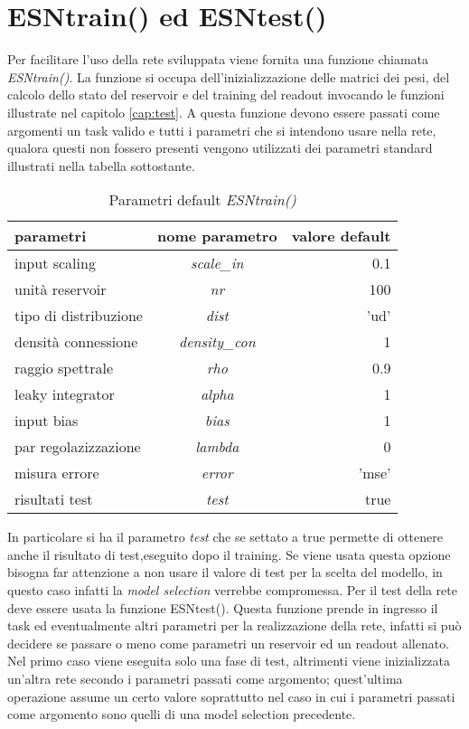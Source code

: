 \section{ESNtrain() ed ESNtest()}
Per facilitare l'uso della rete sviluppata viene fornita una funzione chiamata \textit{ESNtrain()}. La funzione si occupa dell'inizializzazione delle matrici dei pesi, del calcolo dello stato del reservoir e del training del readout invocando le funzioni illustrate nel capitolo \ref{cap:test}. A questa funzione devono essere passati come argomenti un task valido e tutti i parametri che si intendono usare nella rete, qualora questi non fossero presenti vengono utilizzati dei parametri standard illustrati nella tabella sottostante.
\begin{table}[h]
	\begin{center}
	 \begin{tabular}{|l|c|r|}
	 	\hline
	 	\textbf{parametri}		&\textbf{nome parametro}&   \textbf{valore default}\\
	 	\hline
	 	input scaling			&  \textit{scale\_in}	&   0.1\\
	 	\hline
	 	unità reservoir 		&  \textit{nr}          &   100\\
	 	\hline
	 	tipo di distribuzione	&  \textit{dist}        &   'ud'\\
	 	\hline
	 	densità connessione		&  \textit{density\_con}&   1\\
	 	\hline
	 	raggio spettrale		&  \textit{rho}			&   0.9\\
	 	\hline
	 	leaky integrator		&  \textit{alpha}		&   1\\
	 	\hline
	 	input bias				&  \textit{bias}		&   1\\
	 	\hline
	 	par regolazizzazione	&  \textit{lambda}		&   0\\
	 	\hline
	 	misura errore			&  \textit{error}		&   'mse'\\
	 	\hline
	 	risultati test			&  \textit{test}		&   true\\
	 	\hline
	 \end{tabular}
	\end{center}
	\caption{Parametri default \textit{ESNtrain()}}
\end{table}

In particolare si ha il parametro \textit{test} che se settato a true permette di ottenere anche il risultato di test,eseguito dopo il training. Se viene usata questa opzione bisogna far attenzione a non usare il valore di test per la scelta del modello, in questo caso infatti la \textit{model selection} verrebbe compromessa. Per il test della rete deve essere usata la funzione ESNtest(). Questa funzione prende in ingresso il task ed eventualmente altri parametri per la realizzazione della rete, infatti si può decidere se passare o meno come parametri un reservoir ed un readout allenato. Nel primo caso viene eseguita solo una fase di test, altrimenti viene inizializzata un'altra rete secondo i parametri passati come argomento; quest'ultima operazione assume un certo valore soprattutto nel caso in cui i parametri passati come argomento sono quelli di una model selection precedente.

